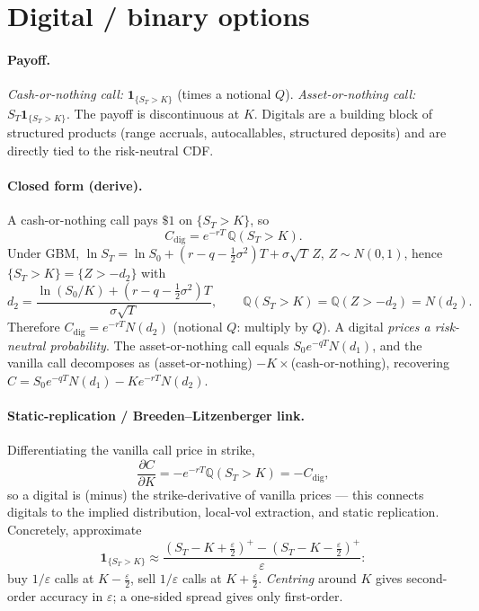 \documentclass[11pt]{article}
\newcommand{\Q}{\mathbb{Q}}
\begin{document}
\section{Digital / binary options}
\label{sec:digital}

\paragraph{Payoff.} \emph{Cash-or-nothing call:} $\mathbf 1_{\{S_T>K\}}$ (times a notional $Q$).
\emph{Asset-or-nothing call:} $S_T\mathbf 1_{\{S_T>K\}}$. The payoff is discontinuous at $K$. Digitals
are a building block of structured products (range accruals, autocallables, structured deposits) and
are directly tied to the risk-neutral CDF.

\paragraph{Closed form (derive).} A cash-or-nothing call pays $\$1$ on $\{S_T>K\}$, so
\[
C_{\text{dig}}=e^{-rT}\,\Q(S_T>K).
\]
Under GBM, $\ln S_T=\ln S_0+(r-q-\tfrac12\sigma^2)T+\sigma\sqrt T\,Z$, $Z\sim N(0,1)$, hence
$\{S_T>K\}=\{Z>-d_2\}$ with
\[
d_2=\frac{\ln(S_0/K)+(r-q-\tfrac12\sigma^2)T}{\sigma\sqrt T},
\qquad
\Q(S_T>K)=\Q(Z>-d_2)=N(d_2).
\]
Therefore $C_{\text{dig}}=e^{-rT}N(d_2)$ (notional $Q$: multiply by $Q$). A digital \emph{prices a
risk-neutral probability}. The asset-or-nothing call equals $S_0e^{-qT}N(d_1)$, and the vanilla call
decomposes as (asset-or-nothing) $-K\times$(cash-or-nothing), recovering
$C=S_0e^{-qT}N(d_1)-Ke^{-rT}N(d_2)$.

\paragraph{Static-replication / Breeden--Litzenberger link.} Differentiating the vanilla call price in
strike,
\[
\frac{\partial C}{\partial K}=-e^{-rT}\Q(S_T>K)=-C_{\text{dig}},
\]
so a digital is (minus) the strike-derivative of vanilla prices --- this connects digitals to the
implied distribution, local-vol extraction, and static replication. Concretely, approximate
\[
\mathbf 1_{\{S_T>K\}}\approx\frac{(S_T-K+\tfrac\varepsilon2)^+-(S_T-K-\tfrac\varepsilon2)^+}{\varepsilon}:
\]
buy $1/\varepsilon$ calls at $K-\tfrac\varepsilon2$, sell $1/\varepsilon$ calls at $K+\tfrac\varepsilon2$.
\emph{Centring} around $K$ gives second-order accuracy in $\varepsilon$; a one-sided spread gives only
first-order.
\end{document}
